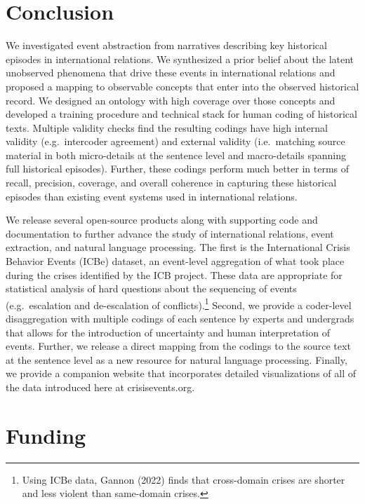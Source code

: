 \documentclass{article}
\begin{document}
\hypertarget{conclusion}{%
\section{Conclusion}\label{conclusion}}

We investigated event abstraction from narratives describing key
historical episodes in international relations. We synthesized a prior
belief about the latent unobserved phenomena that drive these events in
international relations and proposed a mapping to observable concepts
that enter into the observed historical record. We designed an ontology
with high coverage over those concepts and developed a training
procedure and technical stack for human coding of historical texts.
Multiple validity checks find the resulting codings have high internal
validity (e.g.~intercoder agreement) and external validity
(i.e.~matching source material in both micro-details at the sentence
level and macro-details spanning full historical episodes). Further,
these codings perform much better in terms of recall, precision,
coverage, and overall coherence in capturing these historical episodes
than existing event systems used in international relations.

We release several open-source products along with supporting code and
documentation to further advance the study of international relations,
event extraction, and natural language processing. The first is the
International Crisis Behavior Events (ICBe) dataset, an event-level
aggregation of what took place during the crises identified by the ICB
project. These data are appropriate for statistical analysis of hard
questions about the sequencing of events (e.g.~escalation and
de-escalation of conflicts).\footnote{Using ICBe data, Gannon (2022)
  finds that cross-domain crises are shorter and less violent than
  same-domain crises.} Second, we provide a coder-level disaggregation
with multiple codings of each sentence by experts and undergrads that
allows for the introduction of uncertainty and human interpretation of
events. Further, we release a direct mapping from the codings to the
source text at the sentence level as a new resource for natural language
processing. Finally, we provide a companion website that incorporates
detailed visualizations of all of the data introduced here at
crisisevents.org.

\hypertarget{funding}{%
\section{Funding}\label{funding}}
\end{document}
